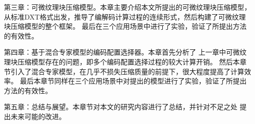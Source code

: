 第三章：可微纹理块压缩模型。本章主要介绍本文所提出的可微纹理块压缩模型，
从标准DXT格式出发，推导了编解码计算过程的连续形式，然后构建了可微纹理块压缩模型的整个框架。
最后在三个应用场景中进行了实验，验证了所提出方法的有效性。

第四章：基于混合专家模型的编码配置选择器。本章首先分析了
上一章中可微纹理块压缩模型存在的问题，即多个编码配置选择过程的较大计算开销。
然后本章节引入了混合专家模型，在几乎不损失压缩质量的前提下，很大程度提高了计算效率。
最后本章节同样在三个应用场景中对提出的模型进行了实验，验证了所提出方法的有效性。

第五章：总结与展望。本章节对本文的研究内容进行了总结，并针对不足之处
提出未来可能的改进。

